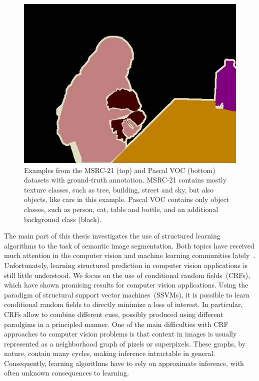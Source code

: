 \begin{figure}[t]
\begin{center}
\begin{tabu}
    \includegraphics[width=\linewidth]{pascal_gt}
    \end{tabu}
    \end{center}
\caption{%
    Examples from the MSRC-21 (top) and Pascal VOC (bottom) datasets with
    ground-truth annotation. MSRC-21 contains mostly texture classes, such as
    tree, building, street and sky, but also objects, like cars in this example.
    Pascal VOC contains only object classes, such as person, cat, table and
    bottle, and an additional background class (black).
}
\end{figure}

The main part of this thesis investigates the use of structured learning~\citep{taskar2003max, tsochantaridis2006large}
algorithms to the task of semantic image segmentation. Both topics have received
much attention in the computer vision and machine learning communities
lately~\citep{ladicky2009associative, krahenbuhl2012efficient,
branson2013efficient, blake2011markov}.
Unfortunately, learning structured prediction in computer vision applications
is still little understood.
We focus on the use of conditional random fields~(CRFs), which have shown
promising  results for computer vision applications. Using the paradigm of structural
support vector machines~(SSVMs), it is possible to learn conditional random fields to
directly minimize a loss of interest. In particular, CRFs
allow to combine different cues, possibly produced using different paradgims in a
principled manner. One of the main difficulties with CRF approaches to computer
vision problems is that context in images is usually represented as a
neighborhood graph of pizels or superpixels.  These graphs, by nature, contain many cycles, making
inference intractable in general. Consequently, learning algorithms have to
rely on approximate inference, with often unknown consequences to learning.

